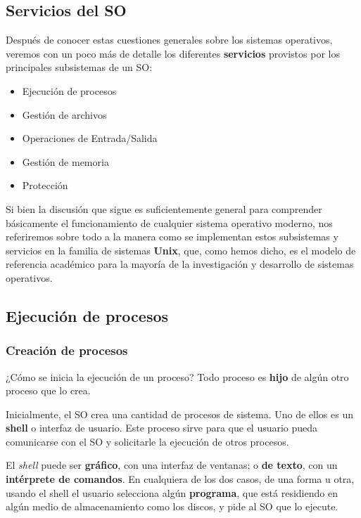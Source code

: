 \documentclass[spanish,a4paper,]{article}
\providecommand{\tightlist}{%
  \setlength{\itemsep}{0pt}\setlength{\parskip}{0pt}}
\begin{document}
\hypertarget{servicios-del-so}{%
\subsection{Servicios del SO}\label{servicios-del-so}}

Después de conocer estas cuestiones generales sobre los sistemas
operativos, veremos con un poco más de detalle los diferentes
\textbf{servicios} provistos por los principales subsistemas de un SO:

\begin{itemize}
\tightlist
\item
  Ejecución de procesos
\item
  Gestión de archivos
\item
  Operaciones de Entrada/Salida
\item
  Gestión de memoria
\item
  Protección
\end{itemize}

Si bien la discusión que sigue es suficientemente general para
comprender básicamente el funcionamiento de cualquier sistema operativo
moderno, nos referiremos sobre todo a la manera como se implementan
estos subsistemas y servicios en la familia de sistemas \textbf{Unix},
que, como hemos dicho, es el modelo de referencia académico para la
mayoría de la investigación y desarrollo de sistemas operativos.

\hypertarget{ejecuciuxf3n-de-procesos}{%
\subsection{Ejecución de procesos}\label{ejecuciuxf3n-de-procesos}}

\hypertarget{creaciuxf3n-de-procesos}{%
\subsubsection{Creación de procesos}\label{creaciuxf3n-de-procesos}}

¿Cómo se inicia la ejecución de un proceso? Todo proceso es
\textbf{hijo} de algún otro proceso que lo crea.

Inicialmente, el SO crea una cantidad de procesos de sistema. Uno de
ellos es un \textbf{shell} o interfaz de usuario. Este proceso sirve
para que el usuario pueda comunicarse con el SO y solicitarle la
ejecución de otros procesos.

El \emph{shell} puede ser \textbf{gráfico}, con una interfaz de
ventanas; o \textbf{de texto}, con un \textbf{intérprete de comandos}.
En cualquiera de los dos casos, de una forma u otra, usando el shell el
usuario selecciona algún \textbf{programa}, que está residiendo en algún
medio de almacenamiento como los discos, y pide al SO que lo ejecute.
\end{document}
